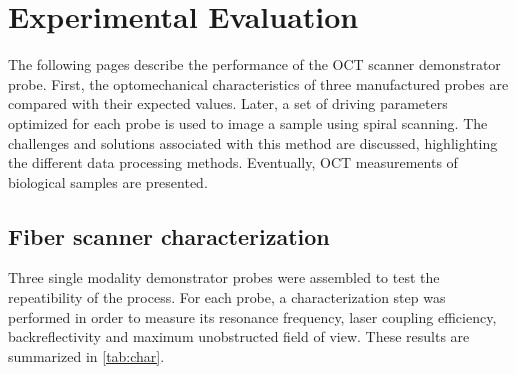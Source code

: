 %
%
\chapter{Experimental Evaluation}
\label{Ch:Measurements}	

The following pages describe the performance of the OCT scanner demonstrator probe. First, the optomechanical characteristics of three manufactured probes are compared with their expected values. Later, a set of driving parameters optimized for each probe is used to image a sample using spiral scanning. The challenges and solutions associated with this method are discussed, highlighting the different data processing methods. Eventually, OCT measurements of biological samples are presented.

\section{Fiber scanner characterization}

Three single modality demonstrator probes were assembled to test the repeatibility of the process.  For each probe, a characterization step was performed in order to measure its resonance frequency, laser coupling efficiency, backreflectivity and maximum unobstructed field of view. These results are summarized in \autoref{tab:char}.

